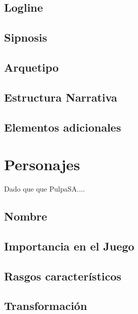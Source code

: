 \documentclass{report}  %
\begin{document}
\subsection{Logline}

\subsection{Sipnosis}

\subsection{Arquetipo}

\subsection{Estructura Narrativa}

\subsection{Elementos adicionales}

\section{Personajes}
Dado que que PulpaSA....
\subsection{Nombre}
\subsection{Importancia en el Juego}
\subsection{Rasgos característicos}
\subsection{Transformación}
\end{document}
